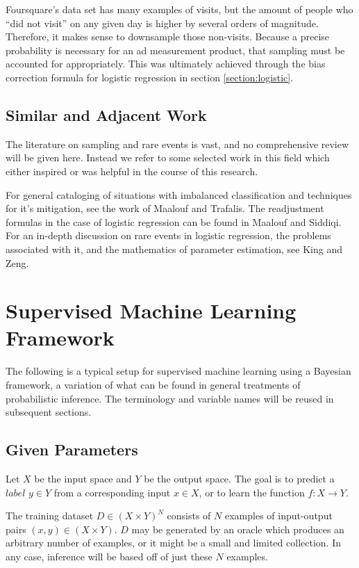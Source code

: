 \documentclass[twoside]{article}
\begin{document}
Foursquare's data set has many examples of visits, but the amount of people who “did not visit” on any given day is higher by several orders of magnitude. Therefore, it makes sense to downsample those non-visits. Because a precise probability is necessary for an ad measurement product, that sampling must be accounted for appropriately. This was ultimately achieved through the bias correction formula for logistic regression in section \ref{section:logistic}.

\subsection{Similar and Adjacent Work}

The literature on sampling and rare events is vast, and no comprehensive review will be given here. Instead we refer to some selected work in this field which either inspired or was helpful in the course of this research.

For general cataloging of situations with imbalanced classification and techniques for it's mitigation, see the work of Maalouf and Trafalis\cite{rareevents}. The readjustment formulas in the case of logistic regression can be found in Maalouf and Siddiqi\cite{weightedlogistic}. For an in-depth discussion on rare events in logistic regression, the problems associated with it, and the mathematics of parameter estimation, see King and Zeng\cite{king}.

\section{Supervised Machine Learning Framework} \label{framework}

The following is a typical setup for supervised machine learning using a Bayesian framework, a variation of what can be found in general treatments of probabilistic inference\cite{pythonbayes}\cite{gelmanbayes}\cite{blais}. The terminology and variable names will be reused in subsequent sections.

\subsection{Given Parameters}

Let \(X\) be the input space and \(Y\) be the output space. The goal is to predict a \(label\) \(y \in Y\) from a corresponding input \(x \in X\), or to learn the function \(f: X \to Y\).

The training dataset \(D \in (X \times Y)^N\) consists of \(N\) examples of input-output pairs \((x, y) \in (X \times Y) \). \(D\) may be generated by an oracle which produces an arbitrary number of examples, or it might be a small and limited collection. In any case, inference will be based off of just these \(N\) examples.
\end{document}
